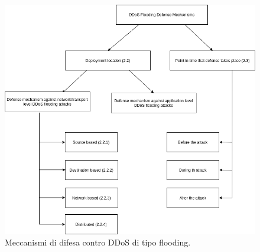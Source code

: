 \begin{figure}[]
    \label{fig:albero_difese}
    \includegraphics[width=\hsize]{images/ddos/ddos_flooding_defence.png}
    \caption{Meccanismi di difesa contro DDoS di tipo flooding.}
    \centering
\end{figure}

